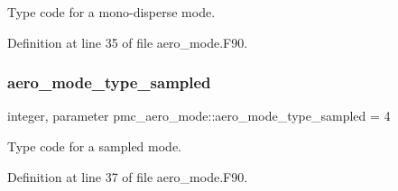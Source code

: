 Type code for a mono-\/disperse mode. 



Definition at line 35 of file aero\+\_\+mode.\+F90.

\mbox{\label{namespacepmc__aero__mode_a86073e0512631b231222d9442877828b}} 
\subsubsection{\texorpdfstring{aero\+\_\+mode\+\_\+type\+\_\+sampled}{aero\_mode\_type\_sampled}}
{\footnotesize\ttfamily integer, parameter pmc\+\_\+aero\+\_\+mode\+::aero\+\_\+mode\+\_\+type\+\_\+sampled = 4}



Type code for a sampled mode. 



Definition at line 37 of file aero\+\_\+mode.\+F90.

